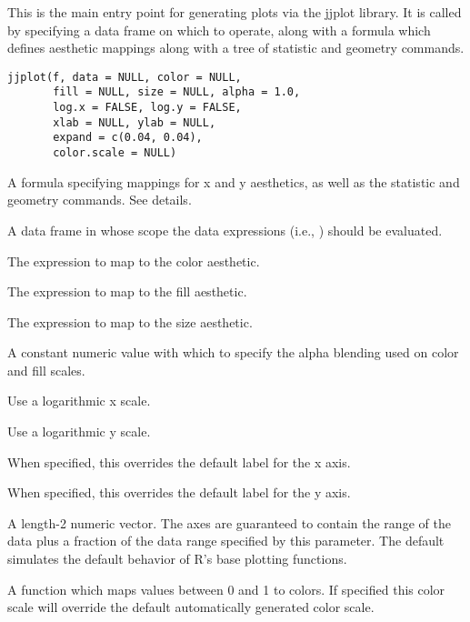 \begin{Description}\relax
This is the main entry point for generating plots via the jjplot
library.   It is called by specifying a data frame on which
to operate, along with a formula which defines aesthetic mappings
along with a tree of statistic and geometry commands.
\end{Description}
\begin{Usage}
\begin{verbatim}
jjplot(f, data = NULL, color = NULL,
       fill = NULL, size = NULL, alpha = 1.0,
       log.x = FALSE, log.y = FALSE,
       xlab = NULL, ylab = NULL,
       expand = c(0.04, 0.04),
       color.scale = NULL)
\end{verbatim}
\end{Usage}
\begin{Arguments}
\begin{ldescription}
\item[\code{f}] A formula specifying mappings for x and y aesthetics, as well as the
statistic and geometry commands.  See details. 

\item[\code{data}] A data frame in whose scope the data expressions (i.e., )
should be evaluated. 

\item[\code{color}] The expression to map to the color aesthetic.

\item[\code{fill}] The expression to map to the fill aesthetic.

\item[\code{size}] The expression to map to the size aesthetic.

\item[\code{alpha}] A constant numeric value with which to specify the alpha blending
used on color and fill scales.

\item[\code{log.x}] Use a logarithmic x scale.

\item[\code{log.y}] Use a logarithmic y scale.

\item[\code{xlab}] When specified, this overrides the default label for the x axis.

\item[\code{ylab}] When specified, this overrides the default label for the y axis.

\item[\code{expand}] A length-2 numeric vector.  The axes are guaranteed to
contain the range of the data plus a fraction of the data range
specified by this parameter.  The default simulates the default
behavior of R's base plotting functions.  
\item[\code{color.scale}] A function which maps values between 0 and 1 to colors.  If
specified this color scale will override the default automatically
generated color scale.

\end{ldescription}
\end{Arguments}
